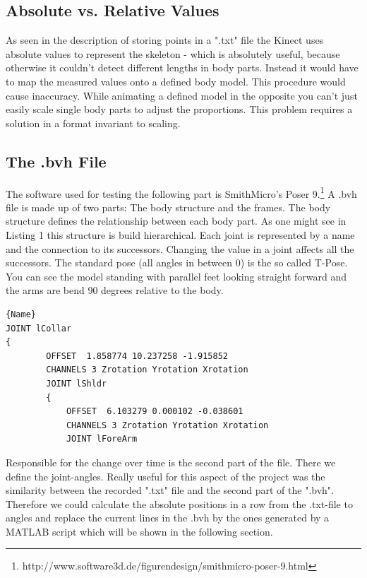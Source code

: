 \documentclass[a4paper]{article}
\begin{document}
\subsection{Absolute vs. Relative Values}

As seen in the description of storing points in a ".txt" file the Kinect uses absolute values to represent the skeleton  - which is absolutely useful, because otherwise it couldn't detect different lengths in body parts.
Instead it would have to map the measured values onto a defined body model.
This procedure would cause inaccuracy.
While animating a defined model in the opposite you can't just easily scale single body parts to adjust the proportions.
This problem requires a solution in a format invariant to scaling.

\subsection{The .bvh File}

The software used for testing the following part is SmithMicro's Poser 9.\footnote{http://www.software3d.de/figurendesign/smithmicro-poser-9.html}
A .bvh file is made up of two parts: The body structure and the frames.
The body structure defines the relationship between each body part.
As one might see in Listing 1 this structure is build hierarchical.
Each joint is represented by a name and the connection to its successors.
Changing the value in a joint affects all the successors. 
The standard pose (all angles in between 0) is the so called T-Pose.
You can see the model standing with parallel feet looking straight forward and the arms are bend 90 degrees relative to the body.

\begin{lstlisting}[caption=.bvh Connected Structure. TODO: MORE TEXT!]{Name}
JOINT lCollar
{
		OFFSET	1.858774 10.237258 -1.915852
		CHANNELS 3 Zrotation Yrotation Xrotation
		JOINT lShldr
		{
			OFFSET	6.103279 0.000102 -0.038601
			CHANNELS 3 Zrotation Yrotation Xrotation
			JOINT lForeArm
\end{lstlisting}

Responsible for the change over time is the second part of the file.
There we define the joint-angles.
Really useful for this aspect of the project was the similarity between the recorded ".txt" file and the second part of the ".bvh".
Therefore we could calculate the absolute positions in a row from the .txt-file to angles and replace the current lines in the .bvh by the ones generated by a MATLAB script which will be shown in the following section.
\end{document}
